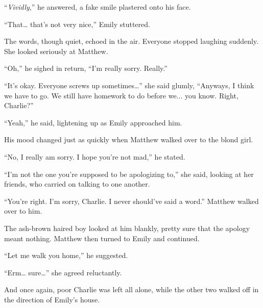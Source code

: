 “\textit{Vividly},” he answered, a fake smile plastered onto his face.

“That… that's not very nice,” Emily stuttered.

The words, though quiet, echoed in the air. Everyone stopped laughing suddenly. She looked seriously at Matthew.

“Oh,” he sighed in return, “I'm really sorry. Really.”

“It's okay. Everyone screws up sometimes…” she said glumly, “Anyways, I think we have to go. We still have homework to do before we... you know. Right, Charlie?”

“Yeah,” he said, lightening up as Emily approached him.

His mood changed just as quickly when Matthew walked over to the blond girl.

“No, I really am sorry. I hope you're not mad,” he stated.

“I'm not the one you're supposed to be apologizing to,” she said, looking at her friends, who carried on talking to one another.

“You're right. I'm sorry, Charlie. I never should've said a word.” Matthew walked over to him.

The ash-brown haired boy looked at him blankly, pretty sure that the apology meant nothing. Matthew then turned to Emily and continued.

“Let me walk you home,” he suggested.

“Erm… sure…” she agreed reluctantly.

And once again, poor Charlie was left all alone, while the other two walked off in the direction of Emily's house.